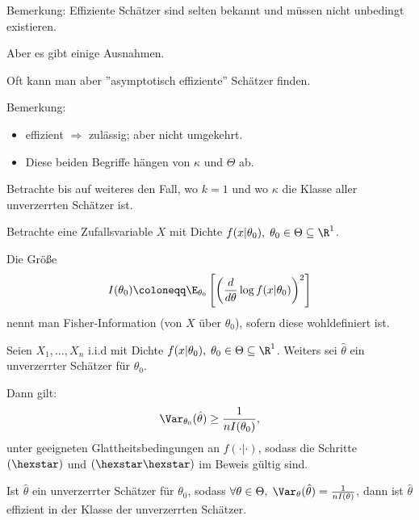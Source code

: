 \documentclass{tstextbook}
\begin{document}
\begin{remark}
	Bemerkung: Effiziente Schätzer sind selten bekannt und müssen nicht unbedingt existieren.
	
	Aber es gibt einige Ausnahmen.
	
	Oft kann man aber ''asymptotisch effiziente'' Schätzer finden.
\end{remark}

\begin{remark}
	Bemerkung:
	\begin{itemize}
		\item effizient $ \Rightarrow $ zulässig; aber nicht umgekehrt.
		\item Diese beiden Begriffe hängen von $\kappa$ und $\Theta$ ab.
	\end{itemize}
\end{remark}

Betrachte bis auf weiteres den Fall, wo $ k=1 $ und wo $\kappa$ die Klasse aller unverzerrten Schätzer ist.

\begin{definition}
	Betrachte eine Zufallsvariable $ X $ mit Dichte $ f(x|\theta_0), \; \theta_0\in\Theta\subseteq\R^1 $.
	
	Die Größe 
	\[
	I(\theta_0) \coloneqq \E_{\theta_{0}} \left[\left(\frac{d}{d\theta}\log f(x|\theta_0)\right)^2\right]	
	\] nennt man Fisher-Information  (von $ X $ über $ \theta_0 $), sofern diese wohldefiniert ist.
\end{definition}

\begin{satz} 
	Seien $ X_1,\ldots,X_n $ i.i.d mit Dichte $ f(x|\theta_0), \; \theta_0\in\Theta\subseteq\R^1 $. Weiters sei $ \hat{\theta} $ ein unverzerrter Schätzer für $ \theta_0 $. 
	
	Dann gilt: \[
	\Var_{\theta_0} (\hat{\theta}) \ge \frac{1}{nI(\theta_0)},
	\] 
	unter geeigneten Glattheitsbedingungen an $ f(\cdot|\cdot) $, sodass die Schritte $ (\hexstar) $ und $ (\hexstar\hexstar) $ im Beweis gültig sind.
\end{satz}

\begin{corollary}
	Ist $ \hat{\theta} $ ein unverzerrter Schätzer für $ \theta_0 $, sodass $ \forall\theta\in\Theta,\; \Var_\theta (\hat{\theta}) = \frac{1}{nI(\theta)} $, dann ist $\hat{\theta}$ effizient in der Klasse der unverzerrten Schätzer.
\end{corollary}
\end{document}
